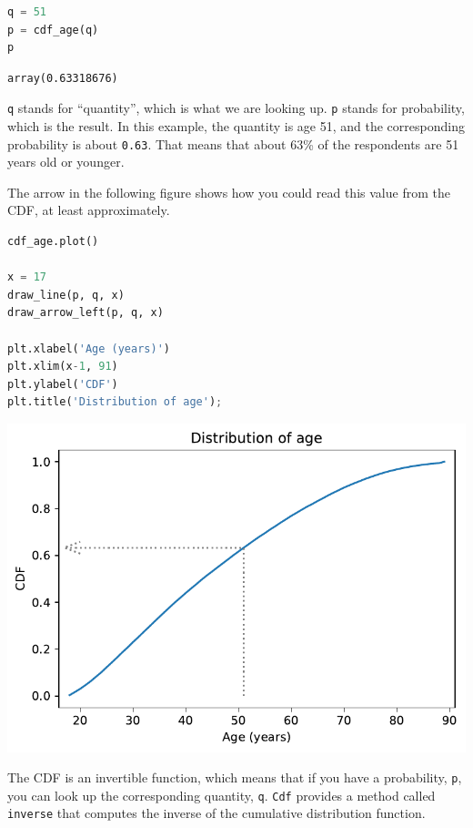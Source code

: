 \begin{lstlisting}[language=Python]
q = 51
p = cdf_age(q)
p
\end{lstlisting}

\begin{lstlisting}[]
array(0.63318676)
\end{lstlisting}

\passthrough{\lstinline!q!} stands for ``quantity'', which is what we
are looking up. \passthrough{\lstinline!p!} stands for probability,
which is the result. In this example, the quantity is age 51, and the
corresponding probability is about \passthrough{\lstinline!0.63!}. That
means that about 63\% of the respondents are 51 years old or younger.

The arrow in the following figure shows how you could read this value
from the CDF, at least approximately.

\begin{lstlisting}[language=Python]
cdf_age.plot()

x = 17
draw_line(p, q, x)
draw_arrow_left(p, q, x)

plt.xlabel('Age (years)')
plt.xlim(x-1, 91)
plt.ylabel('CDF')
plt.title('Distribution of age');
\end{lstlisting}

\begin{center}
\includegraphics[scale=0.75]{chapters/08_distributions_files/08_distributions_73_0.pdf}
\end{center}

The CDF is an invertible function, which means that if you have a
probability, \passthrough{\lstinline!p!}, you can look up the
corresponding quantity, \passthrough{\lstinline!q!}.
\passthrough{\lstinline!Cdf!} provides a method called
\passthrough{\lstinline!inverse!} that computes the inverse of the
cumulative distribution function.

